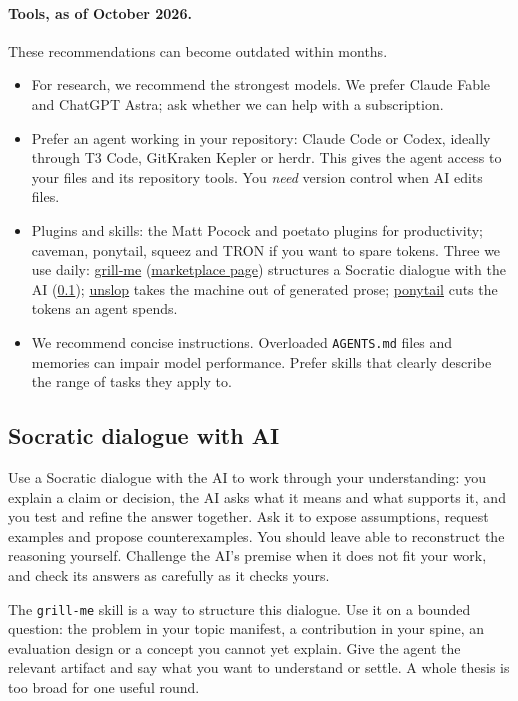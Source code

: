 \paragraph{Tools, as of October 2026.} These recommendations can become outdated within months.
\begin{itemize}
  \item For research, we recommend the strongest models. We prefer Claude Fable and ChatGPT Astra; ask whether we can help with a subscription.
  \item Prefer an agent working in your repository: Claude Code or Codex, ideally through T3 Code, GitKraken Kepler or herdr. This gives the agent access to your files and its repository tools. You \emph{need} version control when AI edits files.
  \item Plugins and skills: the Matt Pocock and poetato plugins for productivity; caveman, ponytail, squeez and TRON if you want to spare tokens. Three we use daily: \href{https://www.aihero.dev/skills-grill-me}{grill-me} (\href{https://claudemarketplaces.com/skills/mattpocock/skills/grill-me}{marketplace page}) structures a Socratic dialogue with the AI (\cref{guide:code:grill}); \href{https://github.com/cursor/plugins/blob/main/pstack/skills/unslop/SKILL.md}{unslop} takes the machine out of generated prose; \href{https://github.com/DietrichGebert/ponytail/blob/main/skills/ponytail/SKILL.md}{ponytail} cuts the tokens an agent spends.
  \item We recommend concise instructions. Overloaded \texttt{AGENTS.md} files and memories can impair model performance. Prefer skills that clearly describe the range of tasks they apply to.
\end{itemize}

\subsection{Socratic dialogue with AI}\label{guide:code:grill}
Use a Socratic dialogue with the AI to work through your understanding: you explain a claim or decision, the AI asks what it means and what supports it, and you test and refine the answer together. Ask it to expose assumptions, request examples and propose counterexamples. You should leave able to reconstruct the reasoning yourself. Challenge the AI's premise when it does not fit your work, and check its answers as carefully as it checks yours.

The \texttt{grill-me} skill is a way to structure this dialogue. Use it on a bounded question: the problem in your topic manifest, a contribution in your spine, an evaluation design or a concept you cannot yet explain. Give the agent the relevant artifact and say what you want to understand or settle. A whole thesis is too broad for one useful round.

